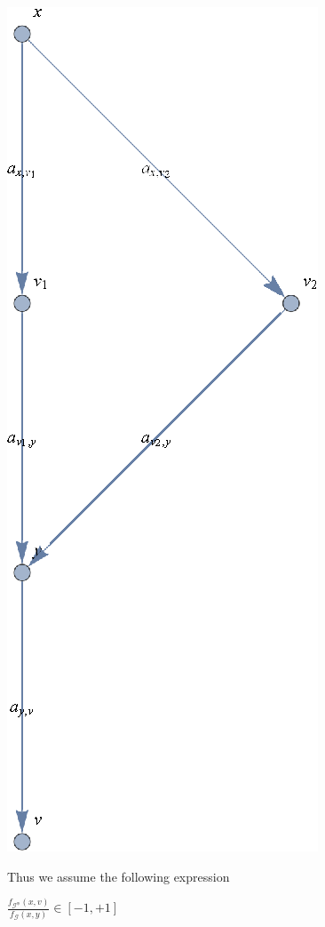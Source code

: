 \documentclass{article}
\newcounter{mathematicafigurecaption}
\begin{document}
\includegraphics{NEOID_gr2.eps}


\caption{\(\text{Figure} \arabic{mathematicafigurecaption}.\)The trust network after adding \(v\)}




Thus we assume the following expression

\(\frac{f_{\mathcal{G}^{\oplus }}(x,v)}{f_{\mathcal{G}}(x,y)}\in [-1,+1]\)
\end{document}
